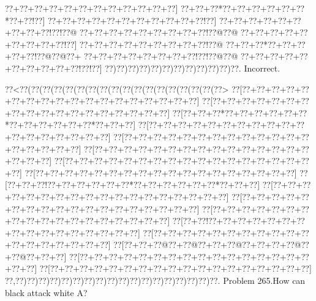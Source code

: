 \documentclass[a5paper]{article}
\begin{document}
\begin{center}
{\goo
\0??+\0??+\0??+\0??+\0??+\0??+\0??+\0??+\0??+\0??+\0??+\0??]
\0??+\0??+\0??*\0??+\0??+\0??+\0??+\0??+\0??*\0??+\0??!\0??]
\0??+\0??+\0??+\0??+\0??+\0??+\0??+\0??+\0??+\0??+\0??!\0??]
\0??+\0??+\0??+\0??+\0??+\0??+\0??+\0??+\0??!\0??!\0??@
\0??+\0??+\0??+\0??+\0??+\0??+\0??+\0??+\0??!\0??@\0??@
\0??+\0??+\0??+\0??+\0??+\0??+\0??+\0??+\0??!\0??]
\0??+\0??+\0??+\0??+\0??+\0??+\0??+\0??+\0??!\0??@
\0??+\0??+\0??*\0??+\0??+\0??+\0??+\0??!\0??@\0??@\0??+
\0??+\0??+\0??+\0??+\0??+\0??+\0??+\0??!\0??!\0??@\0??@
\0??+\0??+\0??+\0??+\0??+\0??+\0??+\0??+\0??+\0??!\0??!\0??]
\0??)\0??)\0??)\0??)\0??)\0??)\0??)\0??)\0??)\0??)\0??)\0??.
}
Incorrect. 

\end{center}
\newpage
\begin{center}
{\goo
\0??<\0??(\0??(\0??(\0??(\0??(\0??(\0??(\0??(\0??(\0??(\0??(\0??(\0??(\0??(\0??(\0??(\0??(\0??>
\0??[\0??+\0??+\0??+\0??+\0??+\0??+\0??+\0??+\0??+\0??+\0??+\0??+\0??+\0??+\0??+\0??+\0??+\0??]
\0??[\0??+\0??+\0??+\0??+\0??+\0??+\0??+\0??+\0??+\0??+\0??+\0??+\0??+\0??+\0??+\0??+\0??+\0??]
\0??[\0??+\0??+\0??*\0??+\0??+\0??+\0??+\0??+\0??*\0??+\0??+\0??+\0??+\0??+\0??*\0??+\0??+\0??]
\0??[\0??+\0??+\0??+\0??+\0??+\0??+\0??+\0??+\0??+\0??+\0??+\0??+\0??+\0??+\0??+\0??+\0??+\0??]
\0??[\0??+\0??+\0??+\0??+\0??+\0??+\0??+\0??+\0??+\0??+\0??+\0??+\0??+\0??+\0??+\0??+\0??+\0??]
\0??[\0??+\0??+\0??+\0??+\0??+\0??+\0??+\0??+\0??+\0??+\0??+\0??+\0??+\0??+\0??+\0??+\0??+\0??]
\0??[\0??+\0??+\0??+\0??+\0??+\0??+\0??+\0??+\0??+\0??+\0??+\0??+\0??+\0??+\0??+\0??+\0??+\0??]
\0??[\0??+\0??+\0??+\0??+\0??+\0??+\0??+\0??+\0??+\0??+\0??+\0??+\0??+\0??+\0??+\0??+\0??+\0??]
\0??[\0??+\0??+\0??!\0??+\0??+\0??+\0??+\0??+\0??*\0??+\0??+\0??+\0??+\0??+\0??*\0??+\0??+\0??]
\0??[\0??+\0??+\0??+\0??+\0??+\0??+\0??+\0??+\0??+\0??+\0??+\0??+\0??+\0??+\0??+\0??+\0??+\0??]
\0??[\0??+\0??+\0??+\0??+\0??+\0??+\0??+\0??+\0??+\0??+\0??+\0??+\0??+\0??+\0??+\0??+\0??+\0??]
\0??[\0??+\0??+\0??+\0??+\0??+\0??+\0??+\0??+\0??+\0??+\0??+\0??+\0??+\0??+\0??+\0??+\0??+\0??]
\0??[\0??+\0??!\0??+\0??+\0??+\0??+\0??+\0??+\0??+\0??+\0??+\0??+\0??+\0??+\0??+\0??+\0??+\0??]
\0??[\0??+\0??+\0??+\0??+\0??+\0??+\0??+\0??+\0??+\0??+\0??+\0??+\0??+\0??+\0??+\0??+\0??+\0??]
\0??[\0??+\0??+\0??@\0??+\0??@\0??+\0??+\0??@\0??+\0??+\0??+\0??@\0??+\0??@\0??+\0??+\0??]
\0??[\0??+\0??+\0??+\0??+\0??+\0??+\0??+\0??+\0??+\0??+\0??+\0??+\0??+\0??+\0??+\0??+\0??+\0??]
\0??[\0??+\0??+\0??+\0??+\0??+\0??+\0??+\0??+\0??+\0??+\0??+\0??+\0??+\0??+\0??+\0??+\0??+\0??]
\0??,\0??)\0??)\0??)\0??)\0??)\0??)\0??)\0??)\0??)\0??)\0??)\0??)\0??)\0??)\0??)\0??)\0??)\0??.
}
Problem 265.How can black attack white A?

\end{center}
\end{document}
